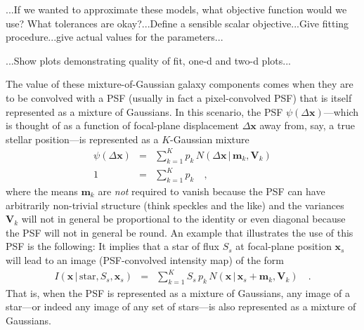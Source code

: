 \documentclass[12pt,pdftex,preprint]{aastex}
\newcommand{\tmatrix}[1]{\boldsymbol{#1}}
\newcommand{\tvector}[1]{\boldsymbol{#1}}
\newcommand{\pos}{\tvector{x}}
\newcommand{\mean}{\tvector{m}}
\newcommand{\var}{\tmatrix{V}\!}
\newcommand{\normal}{N}
\newcommand{\given}{\,|\,}
\renewcommand{\star}{\mathrm{star}}
\begin{document}
...If we wanted to approximate these models, what objective function
would we use?  What tolerances are okay?...Define a sensible scalar
objective...Give fitting procedure...give actual values for the
parameters...

...Show plots demonstrating quality of fit, one-d and two-d plots...

The value of these mixture-of-Gaussian galaxy components comes when
they are to be convolved with a PSF (usually in fact a pixel-convolved
PSF) that is itself represented as a mixture of Gaussians.  In this
scenario, the PSF $\psi(\Delta\pos)$---which is thought of as a
function of focal-plane displacement $\Delta\pos$ away from, say, a
true stellar position---is represented as a $K$-Gaussian mixture
\begin{eqnarray}\displaystyle
\psi(\Delta\pos) &=& \sum_{k=1}^K p_k\,\normal(\Delta\pos\given\mean_k,\var_k)
\\
1 &=& \sum_{k=1}^K p_k
\quad ,
\end{eqnarray}
where the means $\mean_k$ are \emph{not} required to vanish because
the PSF can have arbitrarily non-trivial structure (think speckles and
the like) and the variances $\var_k$ will not in general be
proportional to the identity or even diagonal because the PSF will not
in general be round.  An example that illustrates the use of this PSF
is the following: It implies that a star of flux $S_s$ at focal-plane
position $\pos_s$ will lead to an image (PSF-convolved intensity map)
of the form
\begin{eqnarray}\displaystyle
I(\pos\given\star,S_s,\pos_s) &=& \sum_{k=1}^K S_s\,p_k\,\normal(\pos\given\pos_s+\mean_k,\var_k)
\quad .
\end{eqnarray}
That is, when the PSF is represented as a mixture of Gaussians, any
image of a star---or indeed any image of any set of stars---is also
represented as a mixture of Gaussians.
\end{document}
